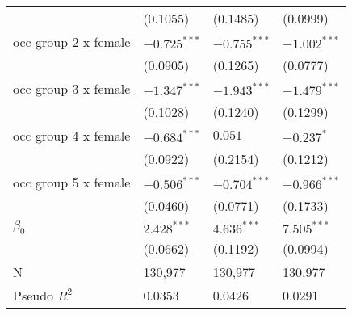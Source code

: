 \begin{tabular}{llll}
                                       &           (0.1055) &           (0.1485) &           (0.0999) \\
occ group 2 x female                   &     $-0.725^{***}$ &     $-0.755^{***}$ &     $-1.002^{***}$ \\
                                       &           (0.0905) &           (0.1265) &           (0.0777) \\
occ group 3 x female                   &     $-1.347^{***}$ &     $-1.943^{***}$ &     $-1.479^{***}$ \\
                                       &           (0.1028) &           (0.1240) &           (0.1299) \\
occ group 4 x female                   &     $-0.684^{***}$ &            $0.051$ &         $-0.237^*$ \\
                                       &           (0.0922) &           (0.2154) &           (0.1212) \\
occ group 5 x female                   &     $-0.506^{***}$ &     $-0.704^{***}$ &     $-0.966^{***}$ \\
                                       &           (0.0460) &           (0.0771) &           (0.1733) \\
$\beta_0$                              &      $2.428^{***}$ &      $4.636^{***}$ &      $7.505^{***}$ \\
                                       &           (0.0662) &           (0.1192) &           (0.0994) \\
\midrule
N                                      &            130,977 &            130,977 &            130,977 \\
Pseudo $R^2$                           &             0.0353 &             0.0426 &             0.0291 \\
\bottomrule
\end{tabular}
